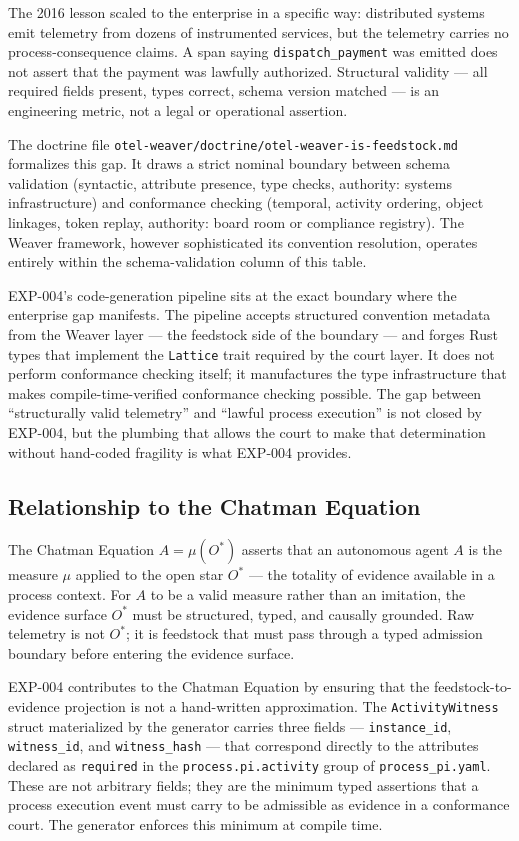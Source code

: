 The 2016 lesson scaled to the enterprise in a specific way: distributed systems emit
telemetry from dozens of instrumented services, but the telemetry carries no
process-consequence claims. A span saying \texttt{dispatch\_payment} was emitted does not
assert that the payment was lawfully authorized. Structural validity --- all required
fields present, types correct, schema version matched --- is an engineering metric, not a
legal or operational assertion.

The doctrine file \texttt{otel-weaver/doctrine/otel-weaver-is-feedstock.md} formalizes
this gap. It draws a strict nominal boundary between schema validation (syntactic,
attribute presence, type checks, authority: systems infrastructure) and conformance
checking (temporal, activity ordering, object linkages, token replay, authority: board room
or compliance registry). The Weaver framework, however sophisticated its convention
resolution, operates entirely within the schema-validation column of this table.

EXP-004's code-generation pipeline sits at the exact boundary where the enterprise gap
manifests. The pipeline accepts structured convention metadata from the Weaver layer ---
the feedstock side of the boundary --- and forges Rust types that implement the
\texttt{Lattice} trait required by the court layer. It does not perform conformance
checking itself; it manufactures the type infrastructure that makes compile-time-verified
conformance checking possible. The gap between ``structurally valid telemetry'' and
``lawful process execution'' is not closed by EXP-004, but the plumbing that allows the
court to make that determination without hand-coded fragility is what EXP-004 provides.

\subsection{Relationship to the Chatman Equation}
\label{sec:otel-weaver-exp-004-registry-to-witness-chatman-equation}

The Chatman Equation $A = \mu(O^*)$ asserts that an autonomous agent $A$ is the measure
$\mu$ applied to the open star $O^*$ --- the totality of evidence available in a process
context. For $A$ to be a valid measure rather than an imitation, the evidence surface
$O^*$ must be structured, typed, and causally grounded. Raw telemetry is not $O^*$; it is
feedstock that must pass through a typed admission boundary before entering the evidence
surface.

EXP-004 contributes to the Chatman Equation by ensuring that the feedstock-to-evidence
projection is not a hand-written approximation. The \texttt{ActivityWitness} struct
materialized by the generator carries three fields --- \texttt{instance\_id},
\texttt{witness\_id}, and \texttt{witness\_hash} --- that correspond directly to the
attributes declared as \texttt{required} in the \texttt{process.pi.activity} group of
\texttt{process\_pi.yaml}. These are not arbitrary fields; they are the minimum typed
assertions that a process execution event must carry to be admissible as evidence in a
conformance court. The generator enforces this minimum at compile time.

